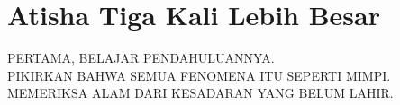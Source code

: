 \chapter{Atisha Tiga Kali Lebih Besar}

PERTAMA, BELAJAR PENDAHULUANNYA. \\
PIKIRKAN BAHWA SEMUA FENOMENA ITU SEPERTI MIMPI. \\
MEMERIKSA ALAM DARI KESADARAN YANG BELUM LAHIR. \\

